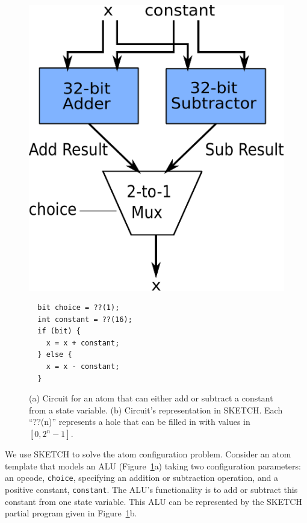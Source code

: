\begin{figure}[h]
  \begin{minipage}{0.4\columnwidth}
  \begin{center}
  \includegraphics[width=\columnwidth]{circuit.pdf}
  \end{center}
  \end{minipage}
  \begin{minipage}{0.55\columnwidth}
  \begin{center}
  \begin{lstlisting}
  bit choice = ??(1);
  int constant = ??(16);
  if (bit) {
    x = x + constant;
  } else {
    x = x - constant;
  }
  \end{lstlisting}
  \end{center}
  \end{minipage}
\caption{\small (a) Circuit for an atom that can either add or subtract a
constant from a state variable.  (b) Circuit's representation in SKETCH.
Each ``??(n)'' represents a hole that can be filled in with values in
  $[0, 2^n -1]$.}
\label{fig:alu_in_sketch}
\end{figure}

We use SKETCH to solve the atom configuration problem.  Consider an atom
template that models an ALU (Figure~\ref{fig:alu_in_sketch}a) taking two
configuration parameters: an opcode, \texttt{choice}, specifying an addition or
subtraction operation, and a positive constant, \texttt{constant}.  The ALU's
functionality is to add or subtract this constant from one state variable. This
ALU can be represented by the SKETCH partial program given in
Figure~\ref{fig:alu_in_sketch}b.

